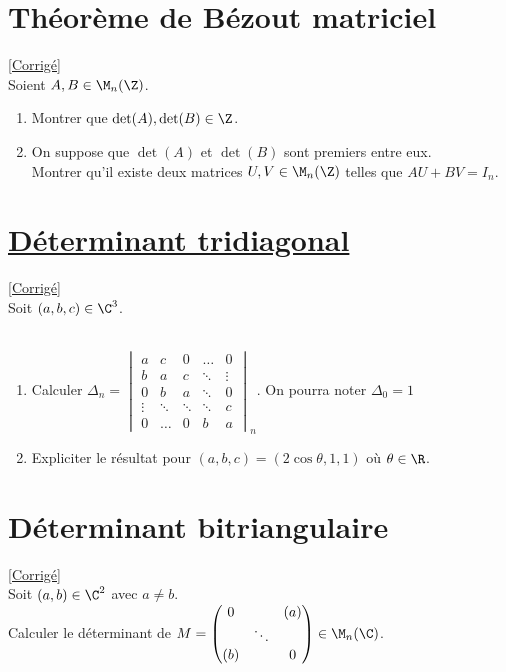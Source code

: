 \documentclass[8pt]{book}
\begin{document}
	\section{Théorème de Bézout matriciel }
	\label{Théorème de Bézout mattriciel}
	\textcolor{blue}{\hyperref[Théorème de Bézout matriciel corrigé]{[Corrigé]}}\\
	Soient $A,B\in\M_n(\Z)$.
	\begin{enumerate}
		\item Montrer que $\det(A),\det(B)\in\Z$.
		\item On suppose que $\det(A)$ et $\det(B)$ sont premiers entre eux.
		\\Montrer qu'il existe deux matrices $U,V\in\M_n(\Z)$ telles que $AU+BV=I_n$.
	\end{enumerate}
	
	\section{\underline{Déterminant tridiagonal} }
	\label{Déterminant tridiagonal}
	\textcolor{blue}{\hyperref[Déterminant tridiagonal corrigé]{[Corrigé]}}\\
	Soit $(a,b,c)\in \C^3$.\\\\
	\begin{enumerate}
		\item Calculer $\Delta_n=
		\begin{vmatrix}
			a     &c     &0     &\dots &0\\
			b     &a     &c     &\ddots&\vdots\\
			0     &b     &a     &\ddots&0\\
			\vdots&\ddots&\ddots&\ddots&c\\
			0     &\dots &0     &b     &a
		\end{vmatrix}_n$.  On pourra noter $\Delta_0=1$
		\item Expliciter le résultat pour $(a,b,c)=(2\cos\theta,1,1)$ où $\theta\in \R$.
	\end{enumerate}
	
	\section{Déterminant bitriangulaire}
	\label{Déterminant bitriangulaire}
	\textcolor{blue}{\hyperref[Déterminant bitriangulaire corrigé]{[Corrigé]}}\\
	Soit $(a,b) \in \C^2$ avec $a\ne b$.\\
	Calculer le déterminant de $M=
	\begin{pmatrix}
		0& &(a)\\
		&\ddots&\\
		(b)& &0\\
	\end{pmatrix}\in \M_n(\C)$.
	
\end{document}
